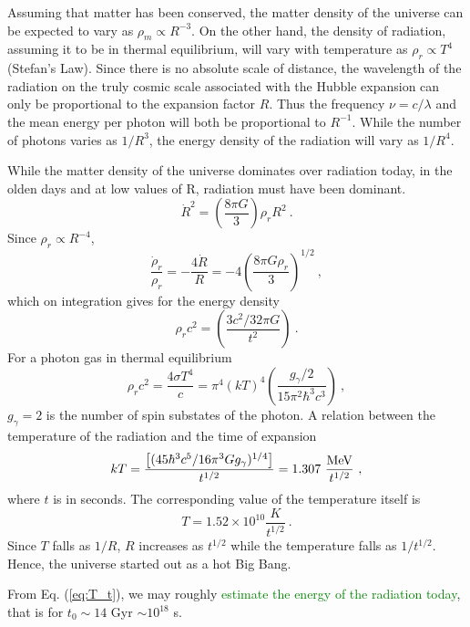 \documentclass[12pt,a4paper]{article}
\begin{document}
Assuming that matter has been conserved, the matter density of the universe can be expected to vary as $\rho_m \propto R^{-3}$. On the other hand, the density of radiation, assuming it to be in thermal equilibrium, will vary with temperature as $\rho_r \propto T^4$ (Stefan's Law). Since there is no absolute scale of distance, the wavelength of the radiation on the truly cosmic scale associated with the Hubble expansion can only be proportional to the expansion factor $R$. Thus the frequency $\nu = c/\lambda$ and the mean energy per photon will both be proportional to $R^{-1}$. While the number of photons varies as $1/R^3$, the energy density of the radiation will vary as $1/R^4$. 

While the matter density of the universe dominates over radiation today, in the olden days and at low values of R, radiation must have been dominant. 
\begin{equation}
\dot{R}^2 = \left( \dfrac{8\pi G}{3} \right) \rho_r R^2 ~.
\end{equation}
Since $\rho_r \propto R^{-4}$,
\begin{equation}
\dfrac{\dot{\rho}_r}{\rho_r} = - \dfrac{4\dot{R}}{R} = -4 \left( \dfrac{8\pi G \rho_r }{3} \right)^{1/2} ~, 
\end{equation}
which on integration gives for the energy density
\begin{equation}
\rho_r c^2 = \left( \dfrac{3c^2 /32\pi G}{t^2} \right) ~.
\end{equation}
For a photon gas in thermal equilibrium
\begin{equation}
\rho_r c^2 = \dfrac{4\sigma T^4}{c} = \pi^4 (kT)^4 \left( \dfrac{g_\gamma/2}{15\pi^2 \hbar^3 c^3} \right)~,
\end{equation}
$g_\gamma = 2$ is the number of spin substates of the photon. A relation between the temperature of the radiation
and the time of expansion
\begin{equation}
kT = \dfrac{\left[(45\hbar^3 c^5/16\pi^3 G g_\gamma)^{1/4}\right]}{t^{1/2}} = 1.307~ \dfrac{{\rm MeV}}{t^{1/2}} ~,
\label{eq:T_t}
\end{equation}
where $t$ is in seconds. The corresponding value of the temperature itself is
\begin{equation}
T = 1.52\times 10^{10} \dfrac{K}{t^{1/2}} ~.
\end{equation}
Since $T$ falls as $1/R$, $R$ increases as $t^{1/2}$ while the temperature falls as $1/t^{1/2}$. Hence, the universe started out as a hot Big Bang.

From Eq. (\ref{eq:T_t}), we may roughly \textcolor{green}{estimate the energy of the radiation today}, that is for $t_0 \sim 14$ Gyr $\sim 10^{18}$ s. 
\end{document}
